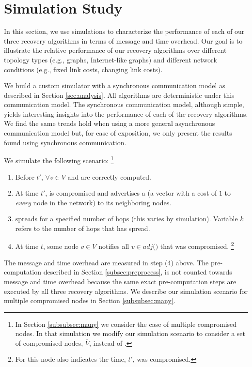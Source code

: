 \section{Simulation Study}
\label{sec:eval}

In this section, we use simulations to characterize the performance of each of our three recovery algorithms in terms of message and time overhead. 
Our goal is to illustrate the relative performance of our recovery algorithms over different topology types (e.g., \er graphs, Internet-like graphs) and
different network conditions (e.g., fixed link costs, changing link costs).


We build a custom simulator with a synchronous communication model as described in Section \ref{sec:analysis}. All algorithms
are deterministic under this communication model. The synchronous communication model, although simple, yields interesting insights into the performance of each of the recovery algorithms.
We find the same trends hold when using a more general asynchronous communication model but, for ease of exposition, we only present the results found using synchronous communication.


We simulate the following scenario: 
{\footnote {\small In Section \ref{subsubsec:many} we consider the case of multiple compromised nodes.  In that simulation we modify our simulation scenario
to consider a set of compromised nodes, $\overline{V}$, instead of \bads.}}
\begin{enumerate}
	\item Before $t'$, $\forall v \in V$ \minvv and \dmatrixv are correctly computed.

	\item At time $t'$, \bad is compromised and advertises a \badvector (a vector with a cost of $1$ to \emph{every} node in the network) to its neighboring nodes.

	\item \badvector spreads for a specified number of hops (this varies by simulation).  Variable $k$ refers to the number of hops that \badvector has spread.

	\item At time $t$, some node $v \in V$ notifies all $v \in adj($\bads$)$ that \bad was compromised. 
	{\footnote { \small For \cpr this node also indicates the time, $t'$, \bad was compromised.}} 

\end{enumerate}
The message and time overhead are measured in step (4) above. The pre-computation described in Section \ref{subsec:preprocess},
is not counted towards message and time overhead because the same exact pre-computation steps are executed by all three recovery algorithms. 
We describe our simulation scenario for multiple compromised nodes in Section \ref{subsubsec:many}.


